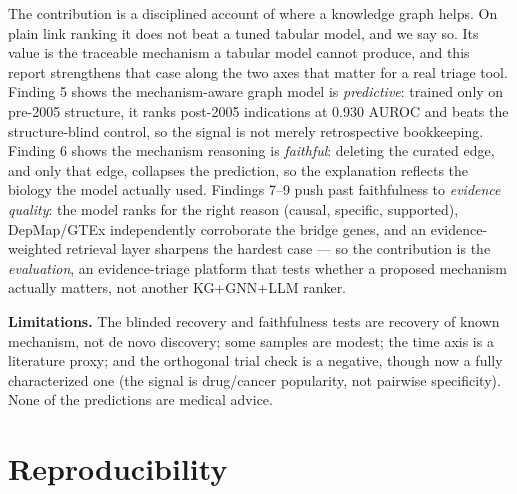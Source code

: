\documentclass[11pt]{article}
\begin{document}
The contribution is a disciplined account of where a knowledge graph helps. On plain link
ranking it does not beat a tuned tabular model, and we say so. Its value is the traceable
mechanism a tabular model cannot produce, and this report strengthens that case along the
two axes that matter for a real triage tool. Finding 5 shows the mechanism-aware graph
model is \emph{predictive}: trained only on pre-2005 structure, it ranks post-2005
indications at 0.930 AUROC and beats the structure-blind control, so the signal is not
merely retrospective bookkeeping. Finding 6 shows the mechanism reasoning is
\emph{faithful}: deleting the curated edge, and only that edge, collapses the prediction,
so the explanation reflects the biology the model actually used. Findings 7--9 push past
faithfulness to \emph{evidence quality}: the model ranks for the right reason (causal,
specific, supported), DepMap/GTEx independently corroborate the bridge genes, and an
evidence-weighted retrieval layer sharpens the hardest case --- so the contribution is the
\emph{evaluation}, an evidence-triage platform that tests whether a proposed mechanism
actually matters, not another KG+GNN+LLM ranker.

\textbf{Limitations.} The blinded recovery and faithfulness tests are recovery of known
mechanism, not de novo discovery; some samples are modest; the time axis is a literature
proxy; and the orthogonal trial check is a negative, though now a fully characterized one
(the signal is drug/cancer popularity, not pairwise specificity). None of the predictions
are medical advice.

\section{Reproducibility}
\end{document}
